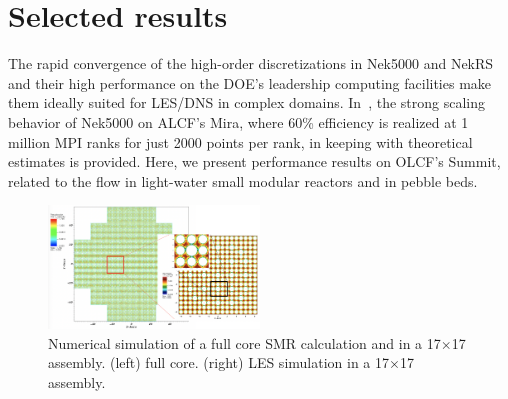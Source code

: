 \documentclass{anstrans}
\begin{document}
\section{Selected results}

The rapid convergence of the high-order discretizations in Nek5000 and NekRS
and their high performance on the DOE's leadership computing facilities make
them ideally suited for LES/DNS in complex domains.  
In~\cite{fischer15}, the strong scaling behavior of Nek5000 on ALCF's Mira, 
where 60\% efficiency is realized at 1 million MPI ranks for just 2000 points 
per rank, in keeping with theoretical estimates is provided.  
Here, we present performance results on OLCF's Summit,
related to the flow in light-water small modular reactors and in pebble beds.

\begin{figure}[!ht]
\centering
\includegraphics[width=0.5\textwidth]{./Figures/full_core_summary.png}
\caption{Numerical simulation of a full core SMR calculation and in a 17$\times$17 assembly.
  (left) full core. (right) LES simulation in a 17$\times$17 assembly.}
\label{fig:gpu2}
\end{figure}
\end{document}
